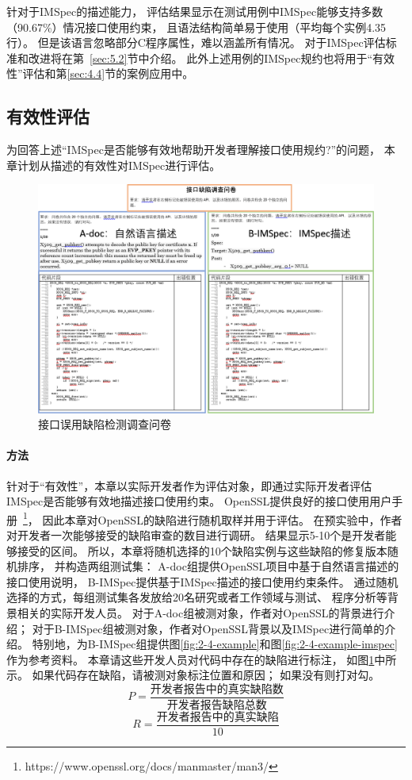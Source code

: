 针对于IMSpec的描述能力，
评估结果显示在测试用例中IMSpec能够支持多数（90.67\%）情况接口使用约束，
且语法结构简单易于使用（平均每个实例4.35行）。
但是该语言忽略部分C程序属性，难以涵盖所有情况。
对于IMSpec评估标准和改进将在第~\ref{sec:5.2}节中介绍。
此外上述用例的IMSpec规约也将用于“有效性”评估和第\ref{sec:4.4}节的案例应用中。


\subsection{有效性评估}
为回答上述“IMSpec是否能够有效地帮助开发者理解接口使用规约?”的问题，
本章计划从描述的有效性对IMSpec进行评估。

\begin{figure}[b]
	\centering
	\includegraphics[width=0.85\linewidth]{figures/cp2-survey.png}
	\caption{
		接口误用缺陷检测调查问卷
	}
	\label{fig:2-5-survey}
\end{figure}

\paragraph{方法}
针对于“有效性”，本章以实际开发者作为评估对象，即通过实际开发者评估IMSpec是否能够有效地描述接口使用约束。
OpenSSL提供良好的接口使用用户手册~\footnote{https://www.openssl.org/docs/manmaster/man3/}，
因此本章对OpenSSL的缺陷进行随机取样并用于评估。
在预实验中，作者对开发者一次能够接受的缺陷审查的数目进行调研。
结果显示5-10个是开发者能够接受的区间。
所以，本章将随机选择的10个缺陷实例与这些缺陷的修复版本随机排序，
并构造两组测试集：
A-doc组提供OpenSSL项目中基于自然语言描述的接口使用说明，
B-IMSpec提供基于IMSpec描述的接口使用约束条件。
通过随机选择的方式，每组测试集各发放给20名研究或者工作领域与测试、
程序分析等背景相关的实际开发人员。
对于A-doc组被测对象，作者对OpenSSL的背景进行介绍；
对于B-IMSpec组被测对象，作者对OpenSSL背景以及IMSpec进行简单的介绍。
特别地，为B-IMSpec组提供图\ref{fig:2-4-example}和图\ref{fig:2-4-example-imspec}作为参考资料。
本章请这些开发人员对代码中存在的缺陷进行标注，
如图\ref{fig:2-5-survey}中所示。
如果代码存在缺陷，请被测对象标注位置和原因；
如果没有则打对勾。
\begin{equation}
\label{eq:p}
P = \dfrac{\text{开发者报告中的真实缺陷数}}{\text{开发者报告缺陷总数}}
\end{equation}
\begin{equation}
\label{eq:r}
R = \dfrac{\text{开发者报告中的真实缺陷}}{10}
\end{equation}


